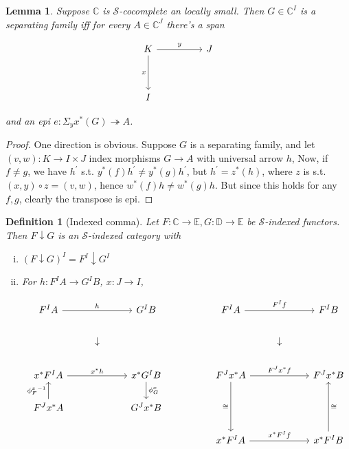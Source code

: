 \documentclass[10pt, oneside]{article}
\newtheorem{definition}[theorem]{Definition}
\newtheorem{lemma}[theorem]{Lemma}
\begin{document}
\begin{lemma}\label{thm:generator-epi-map}
    Suppose $\mathbb{C}$ is $\mathcal{S}$-cocomplete an locally small. Then $G \in \mathbb{C}^I$ is a separating family iff for every $A \in \mathbb{C}^J$ there's a span 

    
    \[\begin{tikzcd}
	K && J \\
	\\
	I
	\arrow["x"', from=1-1, to=3-1]
	\arrow["y", from=1-1, to=1-3]
    \end{tikzcd}\]

    \noindent and an epi $e: \Sigma_y x^\ast  (G) \twoheadrightarrow A$.
\end{lemma}
\begin{proof}
    One direction is obvious. Suppose $G$ is a separating family, and let $(v, w): K \to I \times J$ index morphisms $G \to A$ with universal arrow $h$, Now, if $f \neq g$, we have $h^\prime$ s.t. $y^\ast (f) h^\prime \neq y^\ast (g) h^\prime$, but $h^\prime = z^\ast (h)$, where $z$ is s.t. $(x,y) \circ z = (v, w)$, hence $w^\ast (f) h \neq w^\ast (g) h$. But since this holds for any $f, g$, clearly the transpose is epi.
\end{proof}


\begin{definition}[Indexed comma]
    Let $F: \mathbb{C} \to \mathbb{E}, G: \mathbb{D} \to \mathbb{E}$ be $\mathcal{S}$-indexed functors. Then $F \downarrow G$ is an $\mathcal{S}$-indexed category with

    \begin{enumerate}[i)]
        \item $\left( F \downarrow G \right)^I = F^I \downarrow G^I$

        \item For $h: F^IA \to G^IB$, $x: J \to I$,

        \[\begin{tikzcd}[ampersand replacement=\&]
	{F^IA} \&\& {G^IB} \&\& {F^IA} \&\& {F^IB} \\
	\& \downarrow \&\&\&\& \downarrow \\
	{x^\ast F^I A} \&\& {x^\ast G^I B} \&\& {F^J x^\ast A} \&\& {F^J x^\ast B} \\
	{F^J x^\ast A} \&\& {G^J x^\ast B} \\
	\&\&\&\& {x^\ast F^I A} \&\& {x^\ast F^I B}
	\arrow["h", from=1-1, to=1-3]
	\arrow["{x^\ast h}", from=3-1, to=3-3]
	\arrow["{\phi_G^x}", from=3-3, to=4-3]
	\arrow["{{\phi_F^x}^{-1}}", from=4-1, to=3-1]
	\arrow["{F^If}", from=1-5, to=1-7]
	\arrow["\cong"', from=3-5, to=5-5]
	\arrow["{F^J x^\ast f}", from=3-5, to=3-7]
	\arrow["{x^\ast F^If}", from=5-5, to=5-7]
	\arrow["\cong"', from=5-7, to=3-7]
\end{tikzcd}\]
    \end{enumerate}
\end{definition}
\end{document}

